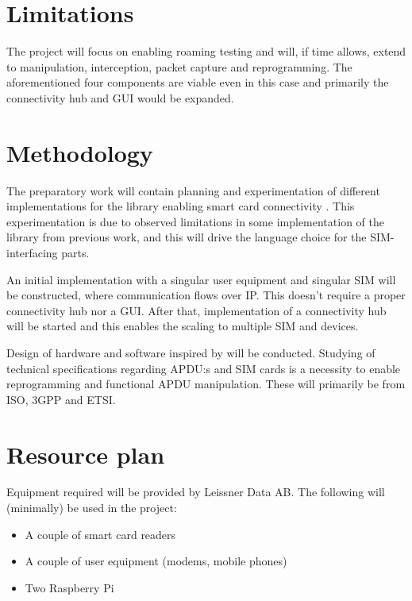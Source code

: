 \documentclass[12pt]{article}
\begin{document}
\section*{Limitations}
The project will focus on enabling roaming testing and will, if
time allows, extend to manipulation, interception, packet capture
and reprogramming. The aforementioned four components are viable
even in this case and primarily the connectivity hub and GUI would
be expanded.

\section*{Methodology}

The preparatory work will contain planning and experimentation of
different implementations for the library enabling smart card
connectivity \cite{pcsc}. This experimentation is due to
observed limitations in some implementation of the library from
previous work, and this will drive the language choice for the
SIM-interfacing parts.

An initial implementation with a singular user equipment and
singular SIM will be constructed, where communication flows over
IP. This doesn't require a proper connectivity hub nor a GUI.
After that, implementation of a connectivity hub will be started
and this enables the scaling to multiple SIM and devices.

Design of hardware and software inspired by \cite{osmo-remsim}
will be conducted. Studying of technical specifications regarding
APDU:s and SIM cards is a necessity to enable reprogramming and
functional APDU manipulation. These will primarily be from ISO,
3GPP and ETSI.

\section*{Resource plan}
Equipment required will be provided by Leissner Data AB.
The following will (minimally) be used in the project:

\begin{itemize}
    \item A couple of smart card readers
    \item A couple of user equipment (modems, mobile phones)
    \item Two Raspberry Pi
\end{itemize}

\printbibliography[
    heading=bibintoc,
    title={References}
]
\end{document}
